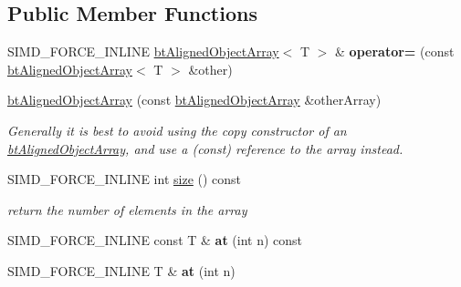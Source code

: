 \subsection*{Public Member Functions}
\begin{DoxyCompactItemize}
\item 
\mbox{\label{classbtAlignedObjectArray_ab6ea335622f18386671194eb6bd6a41b}} 
S\+I\+M\+D\+\_\+\+F\+O\+R\+C\+E\+\_\+\+I\+N\+L\+I\+NE \hyperlink{classbtAlignedObjectArray}{bt\+Aligned\+Object\+Array}$<$ T $>$ \& {\bfseries operator=} (const \hyperlink{classbtAlignedObjectArray}{bt\+Aligned\+Object\+Array}$<$ T $>$ \&other)
\item 
\mbox{\label{classbtAlignedObjectArray_ae91d1383db8069a02d23caf915bc2ce3}} 
\hyperlink{classbtAlignedObjectArray_ae91d1383db8069a02d23caf915bc2ce3}{bt\+Aligned\+Object\+Array} (const \hyperlink{classbtAlignedObjectArray}{bt\+Aligned\+Object\+Array} \&other\+Array)
\begin{DoxyCompactList}\small\item\em Generally it is best to avoid using the copy constructor of an \hyperlink{classbtAlignedObjectArray}{bt\+Aligned\+Object\+Array}, and use a (const) reference to the array instead. \end{DoxyCompactList}\item 
\mbox{\label{classbtAlignedObjectArray_a31de8d83d29c6edd1493fc583091194c}} 
S\+I\+M\+D\+\_\+\+F\+O\+R\+C\+E\+\_\+\+I\+N\+L\+I\+NE int \hyperlink{classbtAlignedObjectArray_a31de8d83d29c6edd1493fc583091194c}{size} () const
\begin{DoxyCompactList}\small\item\em return the number of elements in the array \end{DoxyCompactList}\item 
\mbox{\label{classbtAlignedObjectArray_a26ccc5e9cd7412de584785d219bafff6}} 
S\+I\+M\+D\+\_\+\+F\+O\+R\+C\+E\+\_\+\+I\+N\+L\+I\+NE const T \& {\bfseries at} (int n) const
\item 
\mbox{\label{classbtAlignedObjectArray_a3792644f8e758fae5b4613fbcd1fd30f}} 
S\+I\+M\+D\+\_\+\+F\+O\+R\+C\+E\+\_\+\+I\+N\+L\+I\+NE T \& {\bfseries at} (int n)
\item 

\end{DoxyCompactItemize}
